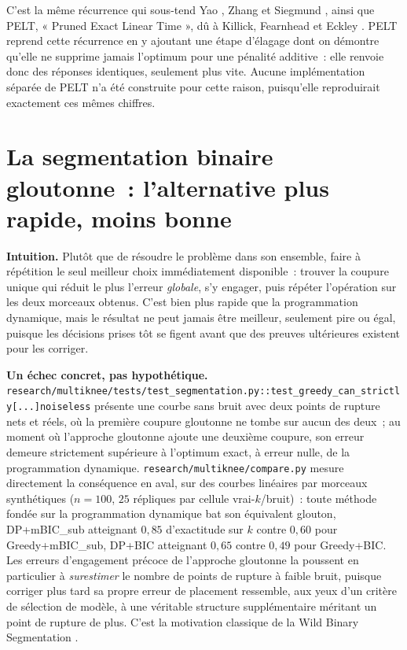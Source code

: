 \documentclass[11pt]{article}
\newcommand{\code}[1]{\texttt{#1}}
\begin{document}
C'est la même récurrence qui sous-tend Yao \citeyearpar{yao1988}, Zhang et
Siegmund \citeyearpar{zhangsiegmund2007}, ainsi que PELT, « Pruned Exact
Linear Time », dû à Killick, Fearnhead et Eckley
\citeyearpar{killick2012}. PELT reprend cette récurrence en y ajoutant une
étape d'élagage dont on démontre qu'elle ne supprime jamais l'optimum pour
une pénalité additive~: elle renvoie donc des réponses identiques,
seulement plus vite. Aucune implémentation séparée de PELT n'a été
construite pour cette raison, puisqu'elle reproduirait exactement ces mêmes
chiffres.

\section{La segmentation binaire gloutonne~: l'alternative plus rapide, moins bonne}
\label{sec:greedy}

\textbf{Intuition.} Plutôt que de résoudre le problème dans son ensemble,
faire à répétition le seul meilleur choix immédiatement disponible~:
trouver la coupure unique qui réduit le plus l'erreur \emph{globale}, s'y
engager, puis répéter l'opération sur les deux morceaux obtenus. C'est bien
plus rapide que la programmation dynamique, mais le résultat ne peut jamais
être meilleur, seulement pire ou égal, puisque les décisions prises tôt se
figent avant que des preuves ultérieures existent pour les corriger.

\textbf{Un échec concret, pas hypothétique.}
\code{research/multiknee/tests/test\_segmentation.py::\allowbreak test\_greedy\_can\_strictly[...]noiseless}
présente une courbe sans bruit avec deux points de rupture nets et réels,
où la première coupure gloutonne ne tombe sur aucun des deux~; au moment où
l'approche gloutonne ajoute une deuxième coupure, son erreur demeure
strictement supérieure à l'optimum exact, à erreur nulle, de la
programmation dynamique. \code{research/multiknee/compare.py} mesure
directement la conséquence en aval, sur des courbes linéaires par
morceaux synthétiques ($n=100$, $25$ répliques par cellule vrai-$k$/bruit)~:
toute méthode fondée sur la programmation dynamique bat son équivalent
glouton, DP+mBIC\_sub atteignant $0{,}85$ d'exactitude sur $k$ contre
$0{,}60$ pour Greedy+mBIC\_sub, DP+BIC atteignant $0{,}65$ contre $0{,}49$
pour Greedy+BIC. Les erreurs d'engagement précoce de l'approche gloutonne
la poussent en particulier à \emph{surestimer} le nombre de points de
rupture à faible bruit, puisque corriger plus tard sa propre erreur de
placement ressemble, aux yeux d'un critère de sélection de modèle, à une
véritable structure supplémentaire méritant un point de rupture de plus.
C'est la motivation classique de la
Wild Binary Segmentation \citep{fryzlewicz2014}.
\end{document}
